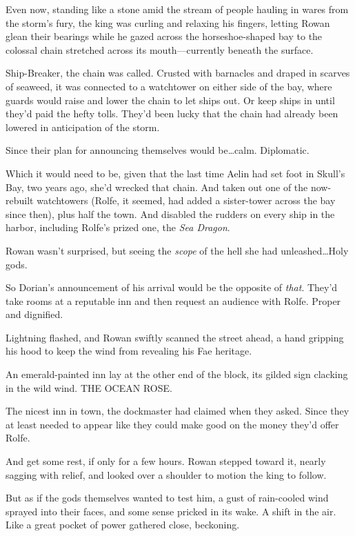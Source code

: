 Even now, standing like a stone amid the stream of people hauling in wares from the storm's fury, the king was curling and relaxing his fingers, letting Rowan glean their bearings while he gazed across the horseshoe-shaped bay to the colossal chain stretched across its mouth---currently beneath the surface.

Ship-Breaker, the chain was called.
Crusted with barnacles and draped in scarves of seaweed, it was connected to a watchtower on either side of the bay, where guards would raise and lower the chain to let ships out.
Or keep ships in until they'd paid the hefty tolls.
They'd been lucky that the chain had already been lowered in anticipation of the storm.

Since their plan for announcing themselves would be\ldots calm.
Diplomatic.

Which it would need to be, given that the last time Aelin had set foot in Skull's Bay, two years ago, she'd wrecked that chain.
And taken out one of the now-rebuilt watchtowers (Rolfe, it seemed, had added a sister-tower across the bay since then), plus half the town.
And disabled the rudders on every ship in the harbor, including Rolfe's prized one, the \emph{Sea Dragon}.

Rowan wasn't surprised, but seeing the \emph{scope} of the hell she had unleashed\ldots Holy gods.

So Dorian's announcement of his arrival would be the opposite of \emph{that}.
They'd take rooms at a reputable inn and then request an audience with Rolfe.
Proper and dignified.

Lightning flashed, and Rowan swiftly scanned the street ahead, a hand gripping his hood to keep the wind from revealing his Fae heritage.

An emerald-painted inn lay at the other end of the block, its gilded sign clacking in the wild wind.
THE OCEAN ROSE.

The nicest inn in town, the dockmaster had claimed when they asked.
Since they at least needed to appear like they could make good on the money they'd offer Rolfe.

And get some rest, if only for a few hours.
Rowan stepped toward it, nearly sagging with relief, and looked over a shoulder to motion the king to follow.

But as if the gods themselves wanted to test him, a gust of rain-cooled wind sprayed into their faces, and some sense pricked in its wake.
A shift in the air.
Like a great pocket of power gathered close, beckoning.

